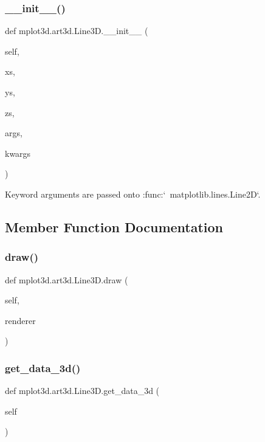 \subsubsection{\texorpdfstring{\+\_\+\+\_\+init\+\_\+\+\_\+()}{\_\_init\_\_()}}
{\footnotesize\ttfamily def mplot3d.\+art3d.\+Line3\+D.\+\_\+\+\_\+init\+\_\+\+\_\+ (\begin{DoxyParamCaption}\item[{}]{self,  }\item[{}]{xs,  }\item[{}]{ys,  }\item[{}]{zs,  }\item[{}]{args,  }\item[{}]{kwargs }\end{DoxyParamCaption})}

\begin{DoxyVerb}Keyword arguments are passed onto :func:`~matplotlib.lines.Line2D`.
\end{DoxyVerb}
 

\subsection{Member Function Documentation}
\mbox{\label{classmplot3d_1_1art3d_1_1Line3D_ac6822908784395454ed00289cb61b4ce}} 
\subsubsection{\texorpdfstring{draw()}{draw()}}
{\footnotesize\ttfamily def mplot3d.\+art3d.\+Line3\+D.\+draw (\begin{DoxyParamCaption}\item[{}]{self,  }\item[{}]{renderer }\end{DoxyParamCaption})}

\mbox{\label{classmplot3d_1_1art3d_1_1Line3D_a048e22553a327bc88e5c9ae493babcf2}} 
\subsubsection{\texorpdfstring{get\+\_\+data\+\_\+3d()}{get\_data\_3d()}}
{\footnotesize\ttfamily def mplot3d.\+art3d.\+Line3\+D.\+get\+\_\+data\+\_\+3d (\begin{DoxyParamCaption}\item[{}]{self }\end{DoxyParamCaption})}

